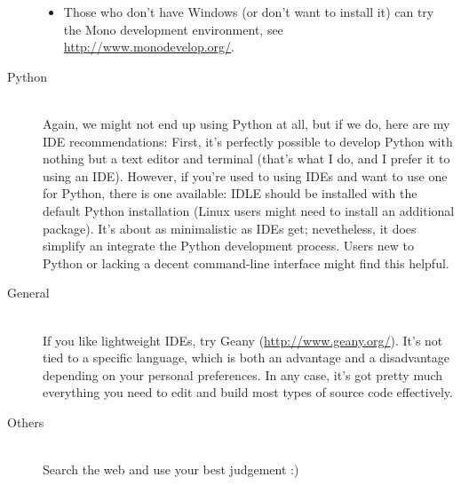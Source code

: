 \documentclass{article}
\begin{document}
\begin{description}
\begin{itemize}
            \item Those who don't have Windows (or don't want to install it) can try the Mono development environment, see \url{http://www.monodevelop.org/}. 
        \end{itemize}
    \item[Python] \hfill \\
        Again, we might not end up using Python at all, but if we do, here are my IDE recommendations: First, it's perfectly possible to develop Python with nothing but a text editor and terminal (that's what I do, and I prefer it to using an IDE). However, if you're used to using IDEs and want to use one for Python, there is one available: IDLE should be installed with the default Python installation (Linux users might need to install an additional package). It's about as minimalistic as IDEs get; nevetheless, it does simplify an integrate the Python development process. Users new to Python or lacking a decent command-line interface might find this helpful.
    \item[General] \hfill \\
        If you like lightweight IDEs, try Geany (\url{http://www.geany.org/}). It's not tied to a specific language, which is both an advantage and a disadvantage depending on your personal preferences. In any case, it's got pretty much everything you need to edit and build most types of source code effectively.
    \item[Others] \hfill \\
        Search the web and use your best judgement :)
\end{description}
\end{document}
